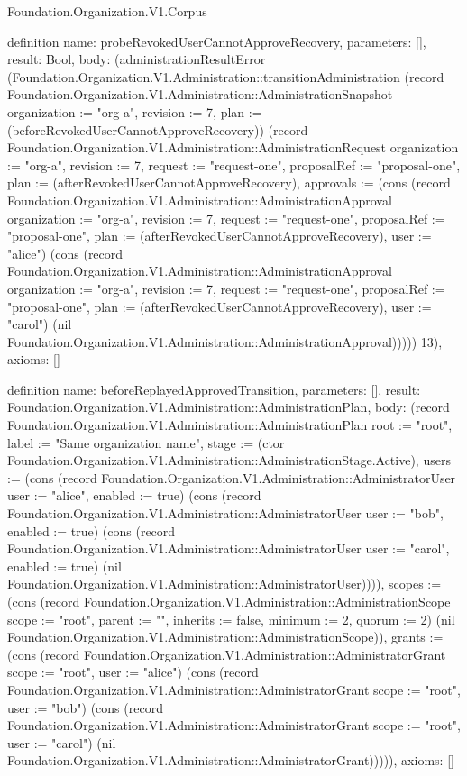 \begin{lexlean}{Foundation.Organization.V1.Corpus}
\begin{semanticmodule}
definition{
  name: probeRevokedUserCannotApproveRecovery,
  parameters: [],
  result: Bool,
  body: (administrationResultError (Foundation.Organization.V1.Administration::transitionAdministration (record Foundation.Organization.V1.Administration::AdministrationSnapshot {organization := "org-a", revision := 7, plan := (beforeRevokedUserCannotApproveRecovery)}) (record Foundation.Organization.V1.Administration::AdministrationRequest {organization := "org-a", revision := 7, request := "request-one", proposalRef := "proposal-one", plan := (afterRevokedUserCannotApproveRecovery), approvals := (cons (record Foundation.Organization.V1.Administration::AdministrationApproval {organization := "org-a", revision := 7, request := "request-one", proposalRef := "proposal-one", plan := (afterRevokedUserCannotApproveRecovery), user := "alice"}) (cons (record Foundation.Organization.V1.Administration::AdministrationApproval {organization := "org-a", revision := 7, request := "request-one", proposalRef := "proposal-one", plan := (afterRevokedUserCannotApproveRecovery), user := "carol"}) (nil Foundation.Organization.V1.Administration::AdministrationApproval)))})) 13),
  axioms: []
}

definition{
  name: beforeReplayedApprovedTransition,
  parameters: [],
  result: Foundation.Organization.V1.Administration::AdministrationPlan,
  body: (record Foundation.Organization.V1.Administration::AdministrationPlan {root := "root", label := "Same organization name", stage := (ctor Foundation.Organization.V1.Administration::AdministrationStage.Active), users := (cons (record Foundation.Organization.V1.Administration::AdministratorUser {user := "alice", enabled := true}) (cons (record Foundation.Organization.V1.Administration::AdministratorUser {user := "bob", enabled := true}) (cons (record Foundation.Organization.V1.Administration::AdministratorUser {user := "carol", enabled := true}) (nil Foundation.Organization.V1.Administration::AdministratorUser)))), scopes := (cons (record Foundation.Organization.V1.Administration::AdministrationScope {scope := "root", parent := "", inherits := false, minimum := 2, quorum := 2}) (nil Foundation.Organization.V1.Administration::AdministrationScope)), grants := (cons (record Foundation.Organization.V1.Administration::AdministratorGrant {scope := "root", user := "alice"}) (cons (record Foundation.Organization.V1.Administration::AdministratorGrant {scope := "root", user := "bob"}) (cons (record Foundation.Organization.V1.Administration::AdministratorGrant {scope := "root", user := "carol"}) (nil Foundation.Organization.V1.Administration::AdministratorGrant))))}),
  axioms: []
}


\end{semanticmodule}
\end{lexlean}

